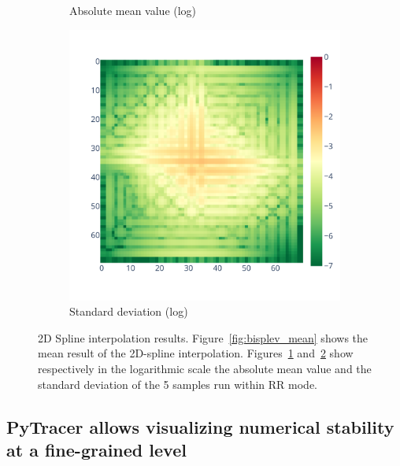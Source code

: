 \documentclass[10pt,journal,compsoc]{IEEEtran}
\newcommand{\pytracer}[0]{PyTracer\xspace}
\begin{document}
\begin{figure}
\begin{subfigure}{.3\linewidth}
        \caption{Absolute mean value (log)}
        \label{fig:bisplev_mean_log}
    \end{subfigure}
    \begin{subfigure}{.3\linewidth}
        \centering
        \includegraphics[width=\linewidth]{figure/spline_2d/bisplev_std_log.pdf}
        \caption{Standard deviation (log)}
        \label{fig:bisplev_std_log}
    \end{subfigure}
    \caption{2D Spline interpolation results. Figure~\ref{fig:bisplev_mean}
        shows the mean result of the 2D-spline interpolation.
        Figures~\ref{fig:bisplev_mean_log} and~\ref{fig:bisplev_std_log} show
        respectively in the logarithmic scale the absolute mean value and the
        standard deviation of the 5 samples run within RR mode. 
    }
    \label{fig:spline2d_rr}
\end{figure}

\subsection{\pytracer allows visualizing numerical stability at a fine-grained level}
\end{document}
